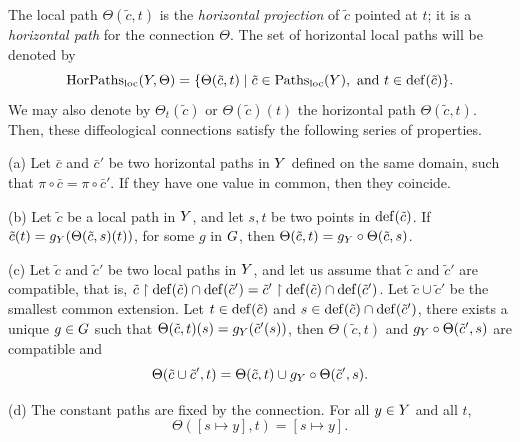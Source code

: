 \begin{article}
  The local path $\Theta(\tilde c,t)$ is the {\em horizontal projection} of $\tilde c$ pointed at $t$;
  it is a {\em horizontal path} for the connection $\Theta$.
  The set of horizontal local paths will be denoted by
  $$%
  \HorPaths_\loc(\Y,\Theta) = \{ \Theta(\tilde c,t) \mid \tilde c \in \Paths_\loc(\Y), \text{ and } t \in \Dom(\tilde c) \}.
  $$%
  We may also denote by $\Theta_t(\tilde c)$ or $\Theta(\tilde c)(t)$ the horizontal path $\Theta(\tilde c, t)$.
  Then, these diffeological connections satisfy the following series of properties.
  
  (a)  Let $\bar c$ and $\bar c'$ be two horizontal paths in $Y$ defined on the same domain,
  such that $\pi \circ \bar c = \pi \circ \bar c'$.
  If they have one value in common,
  then they coincide.
  
  (b)  Let $\tilde c$ be a local path in $Y$, and let $s,t$ be two points in $\mathrm{def}(\tilde c)$.
  If $\tilde c(t) = g_Y(\Theta(\tilde c, s)(t))$,
  for some $g$ in $G$,
  then $\Theta(\tilde c,t) = g_Y \circ \Theta(\tilde c,s)$.
  
  (c) Let $\tilde c$ and $\tilde c'$ be two local paths in $Y$,
  and let us assume that $\tilde c$ and $\tilde c'$ are compatible,
  that is,
  $\tilde c \restriction \mathrm{def}(\tilde c) \cap \mathrm{def}(\tilde c') = \tilde c' \restriction \mathrm{def}(\tilde c) \cap \mathrm{def}(\tilde c')$.
  Let $\tilde c \cup \tilde c'$ be the smallest common extension.
  Let $t \in \mathrm{def}(\tilde c)$ and $s \in \mathrm{def}(\tilde c) \cap \mathrm{def}(\tilde c')$,
  there exists a unique $g \in G$ such that $\Theta(\tilde c,t)(s) = g_Y(\tilde c'(s))$,
  then $\Theta(\tilde c,t)$ and $g_Y \circ \Theta(\tilde c',s)$ are compatible and
  $$%
  \Theta(\tilde c \cup \tilde c',t) = \Theta(\tilde c,t) \cup g_\Y \circ \Theta(\tilde c',s).
  $$%
  
  (d) The constant paths are fixed by the connection.
  For all $y \in Y$ and all $t$,
  $$%
  \Theta([s \mapsto y],t) = [s \mapsto y].
  $$%
  

\end{article}
